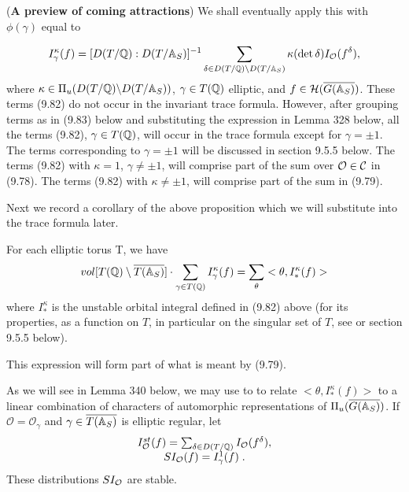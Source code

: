 \begin{remark}
({\bf A preview of coming attractions})
We shall eventually apply this with $\phi (\gamma )$ equal to

\begin{equation}
I_\gamma ^\kappa (f)=
[D(T/{\Bbb{Q}}): D(T/{\Bbb{A}}_S)]^{-1}
\sum_{\delta\in
D(T/{\Bbb{Q}})\backslash D(T/{\Bbb{A}}_S)}
\kappa (\det \delta)I_{\cal{O}}(f^\delta),
\end{equation}
where $\kappa \in \Pi _u(D(T/{\Bbb{Q}})\backslash D(T/{\Bbb{A}}_S))$,
$\gamma\in T({\Bbb{Q}})$ elliptic, and
$f\in {\cal H}(\overline{G({\Bbb{A}}_S)})$.
These terms (9.82) do not occur in the invariant trace formula.
However, after grouping terms as in (9.83) below and substituting
the expression in Lemma 328 below, all the terms (9.82),
$\gamma\in T({\Bbb{Q}})$, will occur in the trace formula
except for $\gamma =\pm 1$. The terms corresponding to
$\gamma =\pm 1$ will be discussed in section 9.5.5 below.
The terms (9.82) with $\kappa = 1$, $\gamma\not= \pm 1$,
will comprise part of the sum over
${\cal{O}}\in {\cal{C}}$ in (9.78). The
terms (9.82) with $\kappa \not= \pm 1$,
will comprise part of the sum in (9.79).  
\end{remark}

Next we record a corollary of the above proposition 
which we will substitute into the trace formula later.

\begin{corollary}
For each elliptic torus T, we have 
\[
vol[T({\Bbb{Q}})\setminus \overline{T({\Bbb{A}}_S)}]\cdot
\sum_{\gamma \in T({\Bbb Q})}
I_\gamma ^\kappa (f)=\sum_\theta <\theta ,I_{*}^\kappa (f)>
\]
where $I_{*}^\kappa $ is the unstable orbital integral defined in
(9.82)
above (for its properties, as a function on $T$, in particular on the
singular set of $T$, see \cite{LL} or section 9.5.5 below).
\end{corollary}

This expression will form part of what is meant by (9.79).

As we will see in Lemma 340 below,
we may use \cite{LL} to to relate $<\theta,I_{*}^\kappa (f)>$ to
a linear combination of characters of automorphic representations of
$\Pi_u(\overline{G({\Bbb{A}}_S)})$. If $\mathcal{O}=\mathcal{O}_\gamma $
and $\gamma \in \overline{T({\Bbb{A}}_S)}$ is elliptic regular, let 
\begin{equation}
\begin{array}{c}
I^{st}_{\cal{O}}(f)=\sum_{\delta\in D(T/{\Bbb{Q}})}
I_{\cal{O}}(f^\delta),\\
SI_{\cal{O}}(f)=I^1_{\gamma}(f)\; .
\end{array}
\end{equation}
These distributions $SI_{\cal{O}}$ are stable.

